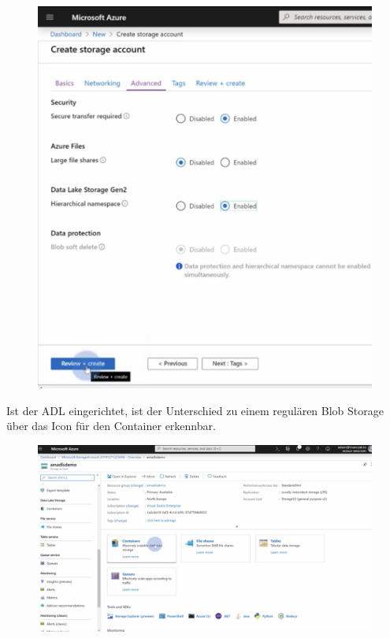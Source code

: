 \begin{itemize}
\begin{figure}[H]
	\centering
	\includegraphics[scale = 0.2]{attachment/chapter_2/Scc113}
\end{figure}
\end{itemize}


Ist der \gls{ADL} eingerichtet, ist der Unterschied zu einem regulären Blob Storage über das Icon für den Container erkennbar.

\begin{figure}[H]
	\centering
	\includegraphics[scale = 0.3]{attachment/chapter_2/Scc114}
\end{figure}

